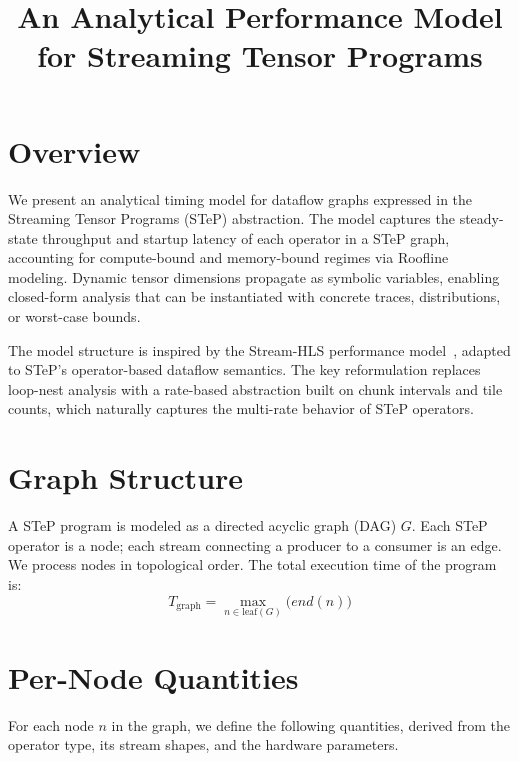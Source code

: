 \documentclass[10pt]{article}
\title{An Analytical Performance Model for Streaming Tensor Programs}
\author{}
\date{}
\begin{document}
\maketitle

\section{Overview}

We present an analytical timing model for dataflow graphs expressed in the Streaming Tensor Programs (STeP) abstraction. The model captures the steady-state throughput and startup latency of each operator in a STeP graph, accounting for compute-bound and memory-bound regimes via Roofline modeling. Dynamic tensor dimensions propagate as symbolic variables, enabling closed-form analysis that can be instantiated with concrete traces, distributions, or worst-case bounds.

The model structure is inspired by the Stream-HLS performance model~\cite{basalama2025streamhls}, adapted to STeP's operator-based dataflow semantics. The key reformulation replaces loop-nest analysis with a rate-based abstraction built on chunk intervals and tile counts, which naturally captures the multi-rate behavior of STeP operators.

\section{Graph Structure}

A STeP program is modeled as a directed acyclic graph (DAG) $G$. Each STeP operator is a node; each stream connecting a producer to a consumer is an edge. We process nodes in topological order. The total execution time of the program is:
\begin{equation}
    T_{\text{graph}} = \max_{n \in \text{leaf}(G)} \bigl(\textit{end}(n)\bigr)
\end{equation}

\section{Per-Node Quantities}

For each node $n$ in the graph, we define the following quantities, derived from the operator type, its stream shapes, and the hardware parameters.
\end{document}
